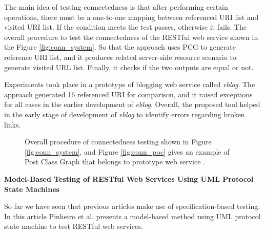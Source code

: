 \documentclass[english]{tktltiki}
\begin{document}
The main idea of testing connectedness is that after performing certain operations, there must be a one-to-one mapping between referenced URI list and visited URI list. If the condition meets the test passes, otherwise it fails. The overall procedure to test the connectedness of the RESTful web service shown in the Figure \ref{fig:conn_system}. So that the approach uses PCG to generate reference URI list, and it produces related server-side resource scenario to generate visited URL list. Finally, it checks if the two outputs are equal or not.

Experiments took place in a prototype of blogging web service called \textit{eblog}. The approach generated 16 referenced URI for comparison, and it raised exceptions for all cases in the earlier development of \textit{eblog}. Overall, the proposed tool helped in the early stage of development of \textit{eblog} to identify errors regarding broken links.
\begin{figure}[h]
	\centering
	\hfill%
	\caption{Overall procedure of connectedness testing shown in Figure \ref{fig:conn_system}, and Figure \ref{fig:conn_poc} gives an example of Post Class Graph that belongs to prototype web service \cite{chakrabarti2010connectedness}.}
\end{figure}

\textbf{Model-Based Testing of RESTful Web Services Using UML Protocol State Machines}

So far we have seen that previous articles make use of specification-based testing. In this article Pinheiro et al. \cite{pinheiro2013model} presents a model-based method using UML protocol state machine to test RESTful web services. 
\end{document}
